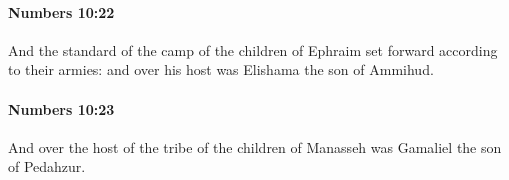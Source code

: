 		\paragraph{Numbers 10:22} %
			\label{NUMBERS-10-22}

			And the standard of the camp of the children of Ephraim set forward according to their armies: and over his host was Elishama the son of Ammihud.


		\paragraph{Numbers 10:23} %
			\label{NUMBERS-10-23}

			And over the host of the tribe of the children of Manasseh was Gamaliel the son of Pedahzur.


